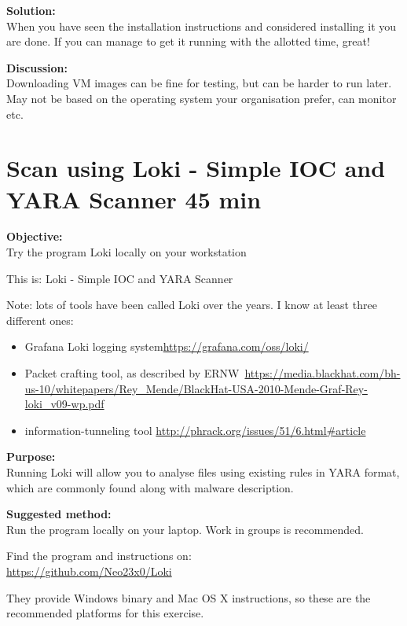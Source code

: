 \documentclass[a4paper,11pt,notitlepage]{report}
\begin{document}
{\bf Solution:}\\
When you have seen the installation instructions and considered installing it you are done. If you can manage to get it running with the allotted time, great!

{\bf Discussion:}\\
Downloading VM images can be fine for testing, but can be harder to run later. May not be based on the operating system your organisation prefer, can monitor etc.




\chapter{Scan using Loki - Simple IOC and YARA Scanner 45 min}
\label{ex:loki-ioc-yara}

{\bf Objective:}\\
Try the program Loki locally on your workstation

This is: Loki - Simple IOC and YARA Scanner

Note: lots of tools have been called Loki over the years. I know at least three different ones:
\begin{itemize}
\item Grafana Loki logging system\url{https://grafana.com/oss/loki/}
\item Packet crafting tool, as described by ERNW\
\url{https://media.blackhat.com/bh-us-10/whitepapers/Rey_Mende/BlackHat-USA-2010-Mende-Graf-Rey-loki_v09-wp.pdf}
\item information-tunneling tool \url{http://phrack.org/issues/51/6.html#article}
\end{itemize}


{\bf Purpose:}\\
Running Loki will allow you to analyse files using existing rules in YARA format, which are commonly found along with malware description.


\begin{alltt}


\end{alltt}


{\bf Suggested method:}\\
Run the program locally on your laptop. Work in groups is recommended.

Find the program and instructions on:\\
\url{https://github.com/Neo23x0/Loki}

They provide Windows binary and Mac OS X instructions, so these are the recommended platforms for this exercise.
\end{document}
